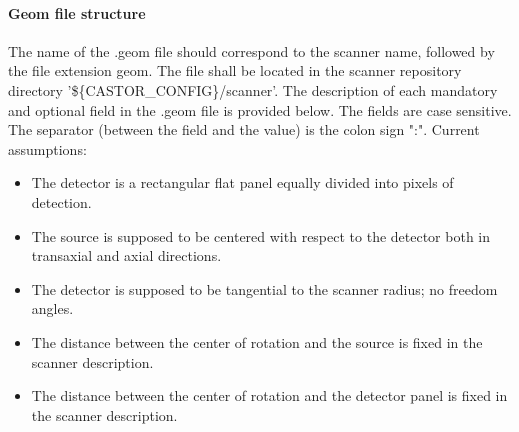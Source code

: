 \documentclass[a4paper, 11pt]{article}
\begin{document}
\paragraph{Geom file structure}
The name of the .geom file should correspond to the scanner name, followed by the file extension geom.
The file shall be located in the scanner repository directory '\$\{CASTOR\_CONFIG\}/scanner'.
The description of each mandatory and optional field in the .geom file is provided below. 
The fields are case sensitive. The separator (between the field and the value) is the colon sign ":".
Current assumptions:
\begin{itemize}
  \item The detector is a rectangular flat panel equally divided into pixels of detection.
  \item The source is supposed to be centered with respect to the detector both in transaxial and axial directions.
  \item The detector is supposed to be tangential to the scanner radius; no freedom angles.
  \item The distance between the center of rotation and the source is fixed in the scanner description.
  \item The distance between the center of rotation and the detector panel is fixed in the scanner description.
\end{itemize}
\end{document}
